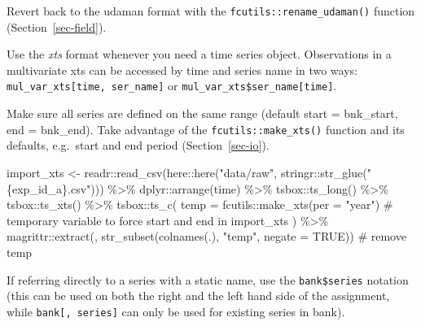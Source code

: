 \documentclass[
  letterpaper,
  DIV=11,
  numbers=noendperiod]{scrreport}
\newenvironment{Shaded}{\begin{snugshade}}{\end{snugshade}}
\newcommand{\AttributeTok}[1]{\textcolor[rgb]{0.40,0.45,0.13}{#1}}
\newcommand{\CommentTok}[1]{\textcolor[rgb]{0.37,0.37,0.37}{#1}}
\newcommand{\ConstantTok}[1]{\textcolor[rgb]{0.56,0.35,0.01}{#1}}
\newcommand{\FunctionTok}[1]{\textcolor[rgb]{0.28,0.35,0.67}{#1}}
\newcommand{\NormalTok}[1]{\textcolor[rgb]{0.00,0.23,0.31}{#1}}
\newcommand{\OtherTok}[1]{\textcolor[rgb]{0.00,0.23,0.31}{#1}}
\newcommand{\SpecialCharTok}[1]{\textcolor[rgb]{0.37,0.37,0.37}{#1}}
\newcommand{\StringTok}[1]{\textcolor[rgb]{0.13,0.47,0.30}{#1}}
\begin{document}
Revert back to the udaman format with the
\texttt{fcutils::rename\_udaman()} function (Section~\ref{sec-field}).

Use the \emph{xts} format whenever you need a time series object.
Observations in a multivariate xts can be accessed by time and series
name in two ways: \texttt{mul\_var\_xts{[}time,\ ser\_name{]}} or
\texttt{mul\_var\_xts\$ser\_name{[}time{]}}.

Make sure all series are defined on the same range (default start =
bnk\_start, end = bnk\_end). Take advantage of the
\texttt{fcutils::make\_xts()} function and its defaults, e.g.~start and
end period (Section~\ref{sec-io}).

\begin{Shaded}
\begin{Highlighting}[]
\NormalTok{import\_xts }\OtherTok{\textless{}{-}}\NormalTok{ readr}\SpecialCharTok{::}\FunctionTok{read\_csv}\NormalTok{(here}\SpecialCharTok{::}\FunctionTok{here}\NormalTok{(}\StringTok{"data/raw"}\NormalTok{, stringr}\SpecialCharTok{::}\FunctionTok{str\_glue}\NormalTok{(}\StringTok{"\{exp\_id\_a\}.csv"}\NormalTok{))) }\SpecialCharTok{\%\textgreater{}\%}
\NormalTok{  dplyr}\SpecialCharTok{::}\FunctionTok{arrange}\NormalTok{(time) }\SpecialCharTok{\%\textgreater{}\%}
\NormalTok{  tsbox}\SpecialCharTok{::}\FunctionTok{ts\_long}\NormalTok{() }\SpecialCharTok{\%\textgreater{}\%}
\NormalTok{  tsbox}\SpecialCharTok{::}\FunctionTok{ts\_xts}\NormalTok{() }\SpecialCharTok{\%\textgreater{}\%}
\NormalTok{  tsbox}\SpecialCharTok{::}\FunctionTok{ts\_c}\NormalTok{(}
    \AttributeTok{temp =}\NormalTok{ fcutils}\SpecialCharTok{::}\FunctionTok{make\_xts}\NormalTok{(}\AttributeTok{per =} \StringTok{"year"}\NormalTok{) }\CommentTok{\# temporary variable to force start and end in import\_xts}
\NormalTok{  ) }\SpecialCharTok{\%\textgreater{}\%}
\NormalTok{  magrittr}\SpecialCharTok{::}\FunctionTok{extract}\NormalTok{(, }\FunctionTok{str\_subset}\NormalTok{(}\FunctionTok{colnames}\NormalTok{(.), }\StringTok{"temp"}\NormalTok{, }\AttributeTok{negate =} \ConstantTok{TRUE}\NormalTok{)) }\CommentTok{\# remove temp}
\end{Highlighting}
\end{Shaded}

If referring directly to a series with a static name, use the
\texttt{bank\$series} notation (this can be used on both the right and
the left hand side of the assignment, while \texttt{bank{[},\ series{]}}
can only be used for existing series in bank).

\begin{Shaded}
\end{Shaded}
\end{document}
